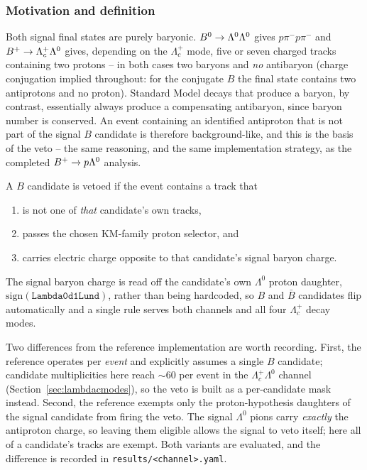 \subsubsection{Motivation and definition}

Both signal final states are purely baryonic. $B^0 \rightarrow
\Lambda^0\Lambda^0$ gives $p\pi^- p\pi^-$ and $B^+ \rightarrow
\Lambda_c^+\Lambda^0$ gives, depending on the $\Lambda_c^+$ mode, five or
seven charged tracks containing two protons -- in both cases two baryons and
\emph{no} antibaryon (charge conjugation implied throughout: for the
conjugate $B$ the final state contains two antiprotons and no proton).
Standard Model decays that produce a baryon, by contrast, essentially always
produce a compensating antibaryon, since baryon number is conserved. An
event containing an identified antiproton that is not part of the signal $B$
candidate is therefore background-like, and this is the basis of the veto --
the same reasoning, and the same implementation strategy, as the completed
$B^+ \rightarrow p\Lambda^0$ analysis.

A $B$ candidate is vetoed if the event contains a track that
\begin{enumerate}
  \item is not one of \emph{that} candidate's own tracks,
  \item passes the chosen KM-family proton selector, and
  \item carries electric charge opposite to that candidate's signal baryon
        charge.
\end{enumerate}
The signal baryon charge is read off the candidate's own $\Lambda^0$ proton
daughter, $\mathrm{sign}(\texttt{Lambda0d1Lund})$, rather than being
hardcoded, so $B$ and $\bar B$ candidates flip automatically and a single
rule serves both channels and all four $\Lambda_c^+$ decay modes.

Two differences from the reference implementation are worth recording. First,
the reference operates per \emph{event} and explicitly assumes a single $B$
candidate; candidate multiplicities here reach ${\sim}60$ per event in the
$\Lambda_c^+\Lambda^0$ channel (Section~\ref{sec:lambdacmodes}), so the veto
is built as a per-candidate mask instead. Second, the reference exempts only
the proton-hypothesis daughters of the signal candidate from firing the
veto. The signal $\Lambda^0$ pions carry \emph{exactly} the antiproton
charge, so leaving them eligible allows the signal to veto itself; here all
of a candidate's tracks are exempt. Both variants are evaluated, and the
difference is recorded in \texttt{results/<channel>.yaml}.


